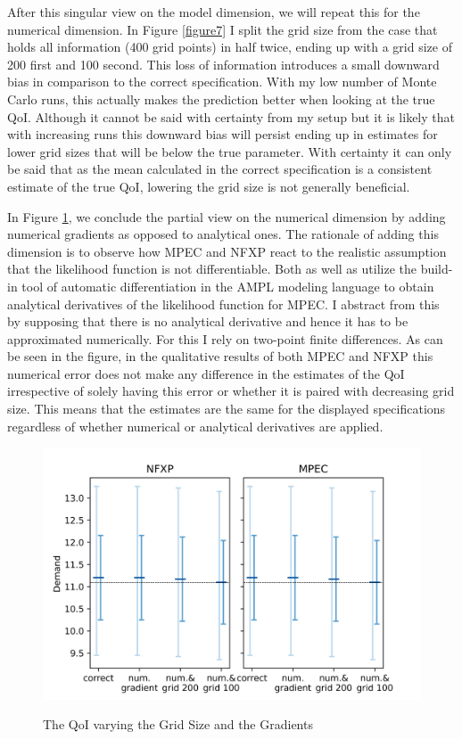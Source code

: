 After this singular view on the model dimension, we will repeat this for the numerical dimension. In Figure \ref{figure7} I split the grid size from the case that holds all information (400 grid points) in half twice, ending up with a grid size of 200 first and 100 second. This loss of information introduces a small downward bias in comparison to the correct specification. With my low number of Monte Carlo runs, this actually makes the prediction better when looking at the true QoI. Although it cannot be said with certainty from my setup but it is likely that with increasing runs this downward bias will persist ending up in estimates for lower grid sizes that will be below the true parameter. With certainty it can only be said that as the mean calculated in the correct specification is a consistent estimate of the true QoI, lowering the grid size is not generally beneficial.

In Figure \ref{figure8}, we conclude the partial view on the numerical dimension by adding numerical gradients as opposed to analytical ones. The rationale of adding this dimension is to observe how MPEC and NFXP react to the realistic assumption that the likelihood function is not differentiable. Both \cite{Su.Judd.2012} as well as \cite{Iskhakov.2016} utilize the build-in tool of automatic differentiation in the AMPL modeling language to obtain analytical derivatives of the likelihood function for MPEC. I abstract from this by supposing that there is no analytical derivative and hence it has to be approximated numerically. For this I rely on two-point finite differences. As can be seen in the figure, in the qualitative results of both MPEC and NFXP this numerical error does not make any difference in the estimates of the QoI irrespective of solely having this error or whether it is paired with decreasing grid size. This means that the estimates are the same for the displayed specifications regardless of whether numerical or analytical derivatives are applied.

\begin{figure}[!b]
	\caption{The QoI varying the Grid Size and the Gradients}
	\vspace*{-4mm}
	\centering
	\includegraphics[scale=0.9]{../figures/figure_8.png}
	\label{figure8}
\end{figure}

